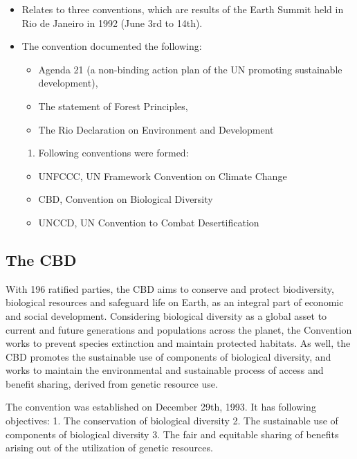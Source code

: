 \documentclass[
  openany]{book}
\providecommand{\tightlist}{%
  \setlength{\itemsep}{0pt}\setlength{\parskip}{0pt}}
\begin{document}
\begin{itemize}
\tightlist
\item
  Relates to three conventions, which are results of the Earth Summit held in Rio de Janeiro in 1992 (June 3rd to 14th).
\item
  The convention documented the following:

  \begin{itemize}
  \tightlist
  \item
    Agenda 21 (a non-binding action plan of the UN promoting sustainable development),
  \item
    The statement of Forest Principles,
  \item
    The Rio Declaration on Environment and Development
  \end{itemize}

  \begin{enumerate}
  \def\labelenumi{\arabic{enumi}.}
  \setcounter{enumi}{61}
  \tightlist
  \item
    Following conventions were formed:
  \end{enumerate}

  \begin{itemize}
  \tightlist
  \item
    UNFCCC, UN Framework Convention on Climate Change
  \item
    CBD, Convention on Biological Diversity
  \item
    UNCCD, UN Convention to Combat Desertification
  \end{itemize}
\end{itemize}

\hypertarget{the-cbd}{%
\subsection{The CBD}\label{the-cbd}}

With 196 ratified parties, the CBD aims to conserve and protect biodiversity, biological resources and safeguard life on Earth, as an integral part of economic and social development. Considering biological diversity as a global asset to current and future generations and populations across the planet, the Convention works to prevent species extinction and maintain protected habitats. As well, the CBD promotes the sustainable use of components of biological diversity, and works to maintain the environmental and sustainable process of access and benefit sharing, derived from genetic resource use.

The convention was established on December 29th, 1993. It has following objectives:
1. The conservation of biological diversity
2. The sustainable use of components of biological diversity
3. The fair and equitable sharing of benefits arising out of the utilization of genetic resources.
\end{document}
